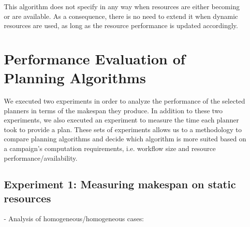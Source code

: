 This algorithm does not specify in any way when resources are either becoming or are available.
As a consequence, there is no need to extend it when dynamic resources are used, as long as the resource performance is updated accordingly.

\section{Performance Evaluation of Planning Algorithms}
\label{sec:algo_perf_comp}

We executed two experiments in order to analyze the performance of the selected planners in terms of the makespan they produce.
In addition to these two experiments, we also executed an experiment to measure the time each planner took to provide a plan.
These sets of experiments allows us to a methodology to compare planning algorithms and decide which algorithm is more suited based on a campaign's computation requirements, i.e. workflow size and resource performance/availability.

\subsection{Experiment 1: Measuring  makespan on static resources}

- Analysis of homogeneous/homogeneous cases:

